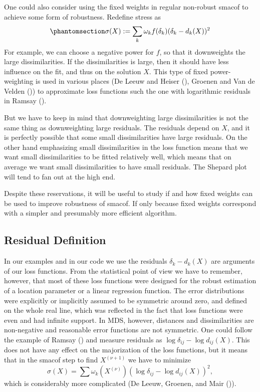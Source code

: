 \documentclass[
  12pt,
  letterpaper,
  DIV=11,
  numbers=noendperiod]{scrartcl}
\theoremstyle{definition}
\theoremstyle{plain}
\theoremstyle{plain}
\theoremstyle{plain}
\theoremstyle{definition}
\theoremstyle{remark}
\begin{document}
One could also consider using the fixed weights in regular non-robust
smacof to achieve some form of robustness. Redefine stress as
\begin{equation}\phantomsection\label{eq-wstress}{
\sigma(X):=\sum_k \omega_kf(\delta_k)(\delta_k-d_k(X))^2
}\end{equation} For example, we can choose a negative power for \(f\),
so that it downweights the large dissimilarities. If the dissimilarities
is large, then it should have less influence on the fit, and thus on the
solution \(X\). This type of fixed power-weighting is used in various
places (De Leeuw and Heiser (),
Groenen and Van de Velden ())
to approximate loss functions such the one with logarithmic residuals in
Ramsay ().

But we have to keep in mind that downweighting large dissimilarities is
not the same thing as downweighting large residuals. The residuals
depend on \(X\), and it is perfectly possible that some small
dissimilarities have large residuals. On the other hand emphasizing
small dissimilarities in the loss function means that we want small
dissimilarities to be fitted relatively well, which means that on
average we want small dissimilarities to have small residuals. The
Shepard plot will tend to fan out at the high end.

Despite these reservations, it will be useful to study if and how fixed
weights can be used to improve robustness of smacof. If only because
fixed weights correspond with a simpler and presumably more efficient
algorithm.

\subsection{Residual Definition}\label{residual-definition}

In our examples and in our code we use the residuals \(\delta_k-d_k(X)\)
are arguments of our loss functions. From the statistical point of view
we have to remember, however, that most of these loss functions were
designed for the robust estimation of a location parameter or a linear
regression function. The error distributions were explicitly or
implicitly assumed to be symmetric around zero, and defined on the whole
real line, which was reflected in the fact that loss functions were even
and had infinite support. In MDS, however, distances and dissimilarities
are non-negative and reasonable error functions are not symmetric. One
could follow the example of Ramsay () and
measure residuals as \(\log\delta_{ij}-\log d_{ij}(X)\). This does not
have any effect on the majorization of the loss functions, but it means
that in the smacof step to find \(X^{(\nu+1)}\) we have to minimize \[
\sigma(X)=\sum \omega_k(X^{(\nu)})(\log\delta_{ij}-\log d_{ij}(X))^2,
\] which is considerably more complicated (De Leeuw, Groenen, and Mair
()).
\end{document}
